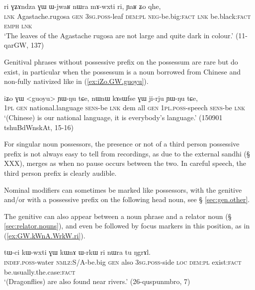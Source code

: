 \begin{exe}
\ex \label{ex:GZAndza.GW.WjwaR}
\gll ri ɣʑɤndza ɣɯ ɯ-jwaʁ nɯra mɤ-wxti ri, ɲaʁ ʑo qhe, \\
\textsc{lnk} Agastache.rugosa \textsc{gen} \textsc{3sg}.\textsc{poss}-leaf \textsc{dem}:\textsc{pl} \textsc{neg}-be.big:\textsc{fact} \textsc{lnk} be.black:\textsc{fact} \textsc{emph} \textsc{lnk} \\
\glt `The leaves of the Agastache rugosa are not large and quite dark in colour.' (11-qarGW, 137)
\end{exe}

Genitival phrases without possessive prefix on the possessum are rare but do exist, in particular when the possessum is a noun borrowed from Chinese and non-fully nativized like  in (\ref{ex:iZo.GW.guoyu}).  

\begin{exe}
\ex \label{ex:iZo.GW.guoyu}
\gll iʑo ɣɯ <guoyu> ɲɯ-ŋu tɕe, nɯnɯ kɤsɯfse ɣɯ ji-rju ɲɯ-ŋu tɕe, \\
\textsc{1pl} \textsc{gen} national.language \textsc{sens}-be \textsc{lnk} dem all \textsc{gen} \textsc{1pl}.\textsc{poss}-speech \textsc{sens}-be \textsc{lnk} \\
\glt `(Chinese) is our national language, it is everybody's language.' (150901 tshuBdWnskAt, 15-16)
\end{exe}

For singular noun possessors, the presence or not of a third person possessive prefix  is not always easy to tell from recordings, as due to the external sandhi (§ XXX),  merges as  when no pause occurs between the two. In careful speech, the third person prefix is clearly audible.

Nominal modifiers can sometimes be marked like possessors, with the genitive and/or with a possessive prefix on the following head noun, see § \ref{sec:gen.other}. 

The genitive can also appear between a noun phrase and a relator noun (§ \ref{sec:relator.nouns}), and even be followed by focus markers in this position, as in (\ref{ex:GW.kWnA.WrkW.ri}).

\begin{exe}
\ex \label{ex:GW.kWnA.WrkW.ri}
\gll   tɯ-ci kɯ-wxti ɣɯ kɯnɤ ɯ-rkɯ ri nɯra tu ŋgrɤl.  \\
\textsc{indef}.\textsc{poss}-water \textsc{nmlz}:S/A-be.big \textsc{gen} also \textsc{3sg}.\textsc{poss}-side \textsc{loc} \textsc{dem}:\textsc{pl} exist:\textsc{fact} be.usually.the.case:\textsc{fact} \\
\glt `(Dragonflies) are also found near rivers.' (26-quspunmbro, 7)
\end{exe}

